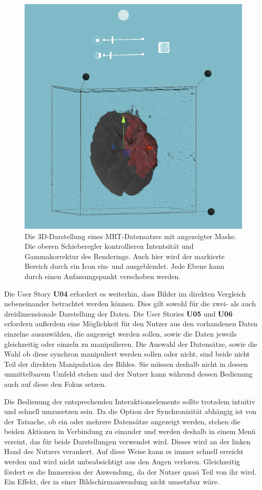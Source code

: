 \begin{figure}[!htb]
	\centering
	\includegraphics[width=0.5\linewidth]{images/mARt3d_2.png}
	\caption{Die 3D-Darstellung eines MRT-Datensatzes mit angezeigter Maske. Die oberen Schieberegler kontrollieren Intentsität und Gammakorrektur des Renderings. Auch hier wird der markierte Bereich durch ein Icon ein- und ausgeblendet. Jede Ebene kann durch einen Anfassungspunkt verschoben werden.}
	\label{img:mARt3d}
\end{figure}
\FloatBarrier

Die User Story \textbf{U04} erfordert es weiterhin, dass Bilder im direkten Vergleich nebeneinander betrachtet werden können. Dies gilt sowohl für die zwei- als auch dreidimensionale Darstellung der Daten. Die User Stories \textbf{U05} und \textbf{U06} erfordern außerdem eine Möglichkeit für den Nutzer aus den vorhandenen Daten einzelne auszuwählen, die angezeigt werden sollen, sowie die Daten jeweils gleichzeitig oder einzeln zu manipulieren. 
Die Auswahl der Datensätze, sowie die Wahl ob diese synchron manipuliert werden sollen oder nicht, sind beide nicht Teil der direkten Manipulation des Bildes. Sie müssen deshalb nicht in dessen unmittelbarem Umfeld stehen und der Nutzer kann während dessen Bedienung auch auf diese den Fokus setzen.
 
Die Bedienung der entsprechenden Interaktionselemente sollte trotzdem intuitiv und schnell umzusetzen sein. Da die Option der Synchronizität abhängig ist von der Tatsache, ob ein oder mehrere Datensätze angezeigt werden, stehen die beiden Aktionen in Verbindung zu einander und werden deshalb in einem Menü vereint, das für beide Darstellungen verwendet wird. Dieses wird an der linken Hand des Nutzers verankert. Auf diese Weise kann es immer schnell erreicht werden und wird nicht unbeabsichtigt aus den Augen verloren. Gleichzeitig fördert es die Immersion der Anwendung, da der Nutzer quasi Teil von ihr wird. Ein Effekt, der in einer Bildschirmanwendung nicht umsetzbar wäre. 

